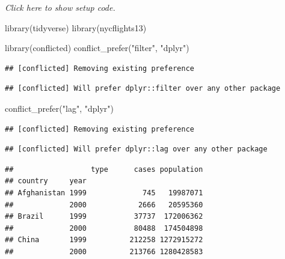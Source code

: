 \documentclass[]{book}
\newenvironment{Shaded}{}{}
\newcommand{\KeywordTok}[1]{\textcolor[rgb]{0.00,0.00,1.00}{#1}}
\newcommand{\NormalTok}[1]{#1}
\newcommand{\OperatorTok}[1]{#1}
\newcommand{\StringTok}[1]{\textcolor[rgb]{0.00,0.50,0.50}{#1}}
\begin{document}
\emph{Click here to show setup code.}

\begin{Shaded}
\begin{Highlighting}[]
\KeywordTok{library}\NormalTok{(tidyverse)}
\KeywordTok{library}\NormalTok{(nycflights13)}

\KeywordTok{library}\NormalTok{(conflicted)}
\KeywordTok{conflict_prefer}\NormalTok{(}\StringTok{"filter"}\NormalTok{, }\StringTok{"dplyr"}\NormalTok{)}
\end{Highlighting}
\end{Shaded}

\begin{verbatim}
## [conflicted] Removing existing preference
\end{verbatim}

\begin{verbatim}
## [conflicted] Will prefer dplyr::filter over any other package
\end{verbatim}

\begin{Shaded}
\begin{Highlighting}[]
\KeywordTok{conflict_prefer}\NormalTok{(}\StringTok{"lag"}\NormalTok{, }\StringTok{"dplyr"}\NormalTok{)}
\end{Highlighting}
\end{Shaded}

\begin{verbatim}
## [conflicted] Removing existing preference
\end{verbatim}

\begin{verbatim}
## [conflicted] Will prefer dplyr::lag over any other package
\end{verbatim}

\begin{Shaded}
\end{Shaded}

\begin{verbatim}
##                  type      cases population
## country     year                           
## Afghanistan 1999             745   19987071
##             2000            2666   20595360
## Brazil      1999           37737  172006362
##             2000           80488  174504898
## China       1999          212258 1272915272
##             2000          213766 1280428583
\end{verbatim}
\end{document}
